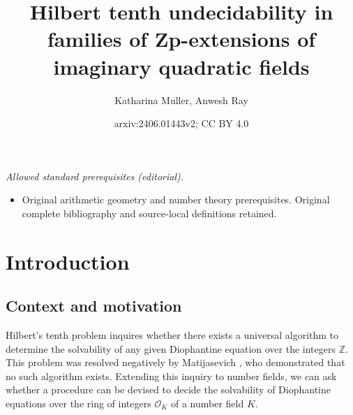 \documentclass[12pt]{amsart}
\title{Hilbert tenth undecidability in families of Zp-extensions of imaginary quadratic fields}
\author{Katharina Muller, Anwesh Ray}
\date{arxiv:2406.01443v2; CC BY 4.0}
\newcommand{\cO}{\mathcal{O}}
\numberwithin{equation}{section}
\begin{document}
\maketitle
\noindent\textit{Allowed standard prerequisites (editorial).}\begin{itemize}
\item Original arithmetic geometry and number theory prerequisites. Original complete bibliography and source-local definitions retained.
\end{itemize}\medskip
\section{Introduction}
\subsection{Context and motivation} Hilbert's tenth problem inquires whether there exists a universal algorithm to determine the solvability of any given Diophantine equation over the integers $\mathbb{Z}$. This problem was resolved negatively by Matijasevich \cite{matiyasevich}, who demonstrated that no such algorithm exists. Extending this inquiry to number fields, we can ask whether a procedure can be devised to decide the solvability of Diophantine equations over the ring of integers $\cO_K$ of a number field $K$.
\end{document}

